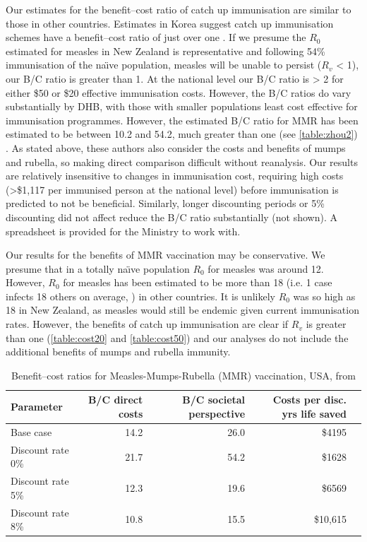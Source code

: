 \documentclass{article}
\begin{document}
  Our estimates for the benefit--cost ratio of catch up immunisation are similar to those in other countries. Estimates in Korea suggest catch up immunisation schemes have a benefit--cost ratio of just over one \citep{bae13}. If we presume the $R_0$ estimated for measles in New Zealand is representative and following 54\% immunisation of the na\"{\i}ve population, measles will be unable to persist ($R_v$ < 1), our B/C ratio is greater than 1. At the national level our B/C ratio is > 2 for either \$50 or \$20 effective immunisation costs. However, the B/C ratios do vary substantially by DHB, with those with smaller populations least cost effective for immunisation programmes. However,  the estimated B/C ratio for MMR has been estimated to be between 10.2 and 54.2, much greater than one (see \autoref{table:zhou2}) \citep{zhou4}. As stated above, these authors also consider the costs and benefits of mumps and rubella, so making direct comparison difficult without reanalysis. Our results are relatively insensitive to changes in immunisation cost, requiring high costs (>\$1,117 per immunised person at the national level) before immunisation is predicted to not be beneficial. Similarly, longer discounting periods or 5\% discounting did not affect reduce the B/C ratio substantially (not shown). A spreadsheet is provided for the Ministry to work with.

Our results for the benefits of MMR vaccination may be conservative. We presume that in a totally na\"{\i}ve population $R_0$ for measles was around 12. However, $R_0$ for measles has been estimated to be more than 18 (i.e. 1 case infects 18 others on average, \citep{anderson91}) in other countries. It is unlikely $R_0$ was so high as 18 in New Zealand, as measles would still be endemic given current immunisation rates. However, the benefits of catch up immunisation are clear if $R_v$ is greater than one (\autoref{table:cost20} and \autoref{table:cost50}) and our analyses do not include the additional benefits of mumps and rubella immunity.

\begin{table}
\begin{center}
\begin{tabular}{lrrrr}
\hline
Parameter & B/C direct costs & B/C societal perspective & Costs per disc. yrs life saved\\
\hline
Base case & 14.2 & 26.0 & \$4195 \\
Discount rate 0\% & 21.7 & 54.2 & \$1628 \\
Discount rate 5\% & 12.3 & 19.6 & \$6569 \\
Discount rate 8\% & 10.8 & 15.5 & \$10,615 \\
\hline
\end{tabular}
\end{center}
\caption{Benefit--cost ratios for Measles-Mumps-Rubella (MMR) vaccination, USA, from \citep{zhou4}}
\label{table:zhou2}
\end{table}%
\end{document}
